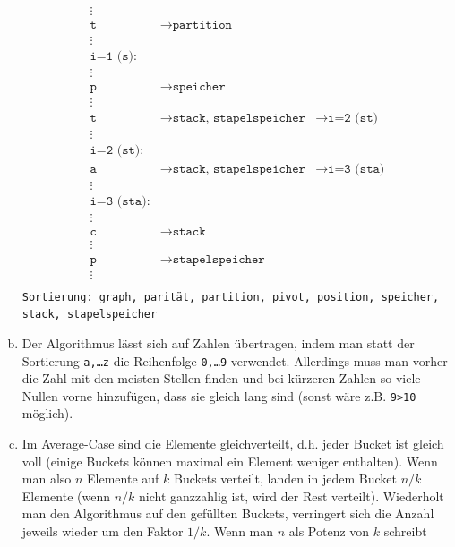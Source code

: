 \documentclass[11pt]{article}
\begin{document}
\begin{enumerate}[a)]
\begin{align*}
        \vdots & & \\ 
        \texttt{t} & \rightarrow \texttt{partition} & \\ 
        \vdots & & \\ 
        \texttt{i=1 (s):} & & \\ 
        \vdots & & \\ 
        \texttt{p} & \rightarrow \texttt{speicher} & \\ 
        \vdots & & \\ 
        \texttt{t} & \rightarrow \texttt{stack, stapelspeicher} & \rightarrow
          \texttt{i=2 (st)} \\ 
        \vdots & & \\ 
        \texttt{i=2 (st):} & & \\ 
        \texttt{a} & \rightarrow \texttt{stack, stapelspeicher} & \rightarrow
          \texttt{i=3 (sta)} \\ 
        \vdots & & \\ 
        \texttt{i=3 (sta):} & & \\
        \vdots & & \\ 
        \texttt{c} & \rightarrow \texttt{stack} & \\ 
        \vdots & & \\ 
        \texttt{p} & \rightarrow \texttt{stapelspeicher} & \\ 
        \vdots & & \\ 
      \end{align*}
      \texttt{Sortierung: graph, parität, partition, pivot, position, speicher,
        stack, stapelspeicher}
    \item 
      Der Algorithmus lässt sich auf Zahlen übertragen, indem man statt der
      Sortierung \texttt{a,\dots z} die Reihenfolge \texttt{0,\dots 9}
      verwendet. Allerdings muss man vorher die Zahl mit den meisten Stellen
      finden und bei kürzeren Zahlen so viele Nullen vorne hinzufügen, dass sie
      gleich lang sind (sonst wäre z.B. \texttt{9>10} möglich).
    \item 
      Im Average-Case sind die Elemente gleichverteilt, d.h. jeder Bucket ist
      gleich voll (einige Buckets können maximal ein Element weniger enthalten).
      Wenn man also $n$ Elemente auf $k$ Buckets verteilt, landen in jedem
      Bucket $n/k$ Elemente (wenn $n/k$ nicht ganzzahlig ist, wird der Rest
      verteilt). Wiederholt man den Algorithmus auf den gefüllten Buckets,
      verringert sich die Anzahl jeweils wieder um den Faktor $1/k$. Wenn man
      $n$ als Potenz von $k$ schreibt

\end{enumerate}
\end{document}
